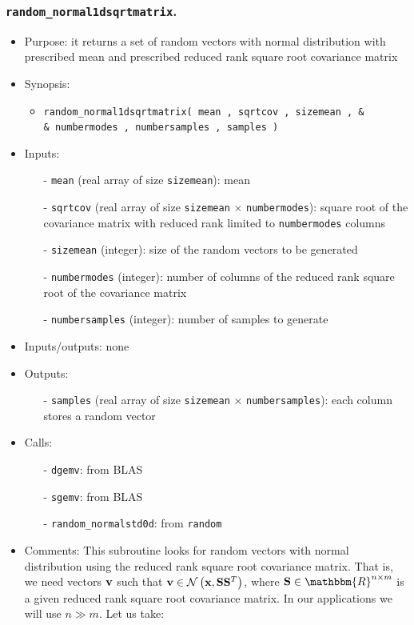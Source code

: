 \documentclass[12pt]{article}
\begin{document}
\subsubsection{{\tt random\_normal1dsqrtmatrix}.}
\begin{itemize}
\item Purpose: it returns a set of random vectors with normal distribution with prescribed mean and prescribed reduced rank square root covariance matrix
\item Synopsis: 
\begin{itemize}
\item {\tt random\_normal1dsqrtmatrix( mean , sqrtcov , sizemean , \& \\ \& numbermodes , numbersamples , samples )}
\end{itemize}
\item Inputs: 
\begin{itemize}
\item[-] {\tt mean} (real array of size {\tt sizemean}): mean
\item[-] {\tt sqrtcov} (real array of size {\tt sizemean} $\times$ {\tt numbermodes}): square root of the covariance matrix with reduced rank limited to {\tt numbermodes} columns
\item[-] {\tt sizemean} (integer): size of the random vectors to be generated
\item[-] {\tt numbermodes} (integer): number of columns of the reduced rank square root of the covariance matrix 
\item[-] {\tt numbersamples} (integer): number of samples to generate
\end{itemize}
\item Inputs/outputs: none
\item Outputs:
\begin{itemize}
\item[-] {\tt samples} (real array of size {\tt sizemean} $\times$ {\tt numbersamples}): each column stores a random vector
\end{itemize}
\item Calls: 
\begin{itemize}
\item[-] {\tt dgemv}: from BLAS
\item[-] {\tt sgemv}: from BLAS
\item[-] {\tt random\_normalstd0d}: from {\tt random}
\end{itemize}
\item Comments: This subroutine looks for random vectors with normal distribution using the reduced rank square root covariance matrix. That is, we need vectors ${\bf v}$ such that ${\bf v} \in \mathcal{N} \left( {\bf x} , {\bf S} {\bf S}^T \right)$, where ${\bf S} \in \mathbbm{R}^{n \times m}$ is a given reduced rank square root covariance matrix. In our applications we will use $n \gg m$. Let us take:

\end{itemize}
\end{document}
